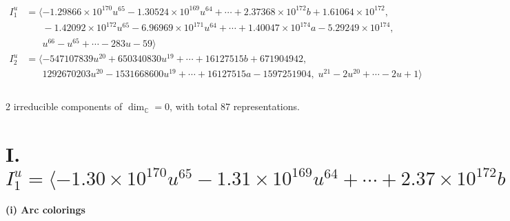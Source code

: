 \documentclass[1p]{elsarticle_modified}
\theoremstyle{definition}
\begin{document}
\begin{align*}
I^u_{1}&=\langle 
-1.29866\times10^{170} u^{65}-1.30524\times10^{169} u^{64}+\cdots+2.37368\times10^{172} b+1.61064\times10^{172},\\
\phantom{I^u_{1}}&\phantom{= \langle  }-1.42092\times10^{172} u^{65}-6.96969\times10^{171} u^{64}+\cdots+1.40047\times10^{174} a-5.29249\times10^{174},\\
\phantom{I^u_{1}}&\phantom{= \langle  }u^{66}- u^{65}+\cdots-283 u-59\rangle \\
I^u_{2}&=\langle 
-547107839 u^{20}+650340830 u^{19}+\cdots+16127515 b+671904942,\\
\phantom{I^u_{2}}&\phantom{= \langle  }1292670203 u^{20}-1531668600 u^{19}+\cdots+16127515 a-1597251904,\;u^{21}-2 u^{20}+\cdots-2 u+1\rangle \\
\\
\end{align*}
\raggedright * 2 irreducible components of $\dim_{\mathbb{C}}=0$, with total 87 representations.\\
\newpage
\renewcommand{\arraystretch}{1}
\centering \section*{I. $I^u_{1}= \langle -1.30\times10^{170} u^{65}-1.31\times10^{169} u^{64}+\cdots+2.37\times10^{172} b+1.61\times10^{172},\;-1.42\times10^{172} u^{65}-6.97\times10^{171} u^{64}+\cdots+1.40\times10^{174} a-5.29\times10^{174},\;u^{66}- u^{65}+\cdots-283 u-59 \rangle$}
\flushleft \textbf{(i) Arc colorings}\\
\end{document}

